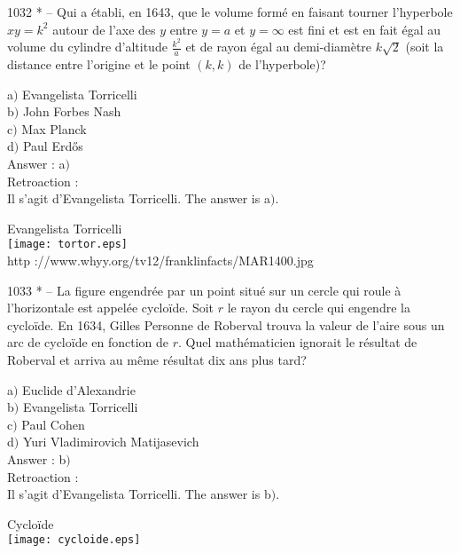 ﻿\documentclass[letterpaper, 12pt]{article}
\begin{document}
1032 * -- Qui a \'etabli, en 1643, que le volume form\'e en faisant
tourner l'hyperbole $xy=k^2$ autour de l'axe des $y$ entre $y=a$ et
$y=\infty$ est fini et est en fait \'egal au volume du cylindre
d'altitude $\frac{k^2}a$ et de rayon \'egal au demi-diam\`etre
$k\sqrt2$ (soit la distance entre l'origine et le point $(k,k)$ de
l'hyperbole)?

a$)$ Evangelista Torricelli \\
b$)$ John Forbes Nash \\
c$)$ Max Planck \\
d$)$ Paul Erd\H{o}s  \\

Answer : a$)$\\

Retroaction : \\
Il s'agit d'Evangelista Torricelli. The answer is a$)$.\\

        \begin{center}
        Evangelista Torricelli\\
    \texttt{[image: tortor.eps]}\\
        {\footnotesize http ://www.whyy.org/tv12/franklinfacts/MAR1400.jpg}
    \end{center}

1033 * -- La figure engendr\'ee par un point situ\'e sur un cercle
qui roule \`a l'horizontale est appel\'ee cyclo\"ide. Soit $r$ le
rayon du cercle qui engendre la cyclo\"ide. En 1634, Gilles Personne
de Roberval trouva la valeur de l'aire sous un arc de cyclo\"ide en
fonction de $r$. Quel math\'ematicien ignorait le r\'esultat de
Roberval et arriva au m\^eme r\'esultat dix ans plus tard?

a$)$ Euclide d'Alexandrie \\
b$)$ Evangelista Torricelli \\
c$)$ Paul Cohen \\
d$)$ Yuri Vladimirovich Matijasevich\\

Answer : b$)$\\

Retroaction : \\
Il s'agit d'Evangelista Torricelli. The answer is b$)$.\\

        \begin{center}
Cyclo\"ide\\
    \texttt{[image: cycloide.eps]}\\
    \end{center}
\end{document}
